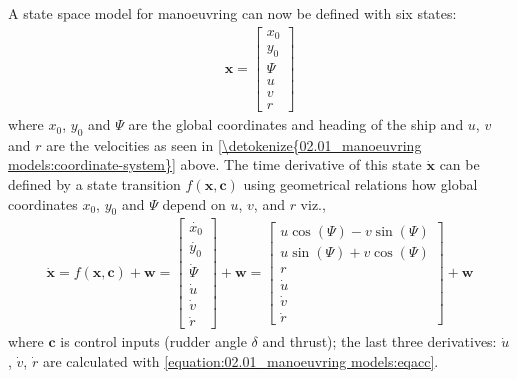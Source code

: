 \noindent A state space model for manoeuvring can now be defined with six states:
\begin{equation}\label{equation:02.01_manoeuvring models:eq_x}
\begin{split}\displaystyle \mathbf{x} = \left[\begin{matrix}x_{0}\\y_{0}\\\Psi\\u\\v\\r\end{matrix}\right]\end{split}
\end{equation}
\noindent where $x_0$, $y_0$ and $\Psi$ are the global coordinates and heading of the ship and $u$, $v$ and $r$ are the velocities as seen in \autoref{\detokenize{02.01_manoeuvring models:coordinate-system}} above.
The time derivative of this state \(\dot{\mathbf{x}}\) can be defined by a state transition \(f(\mathbf{x},\mathbf{c})\) using geometrical relations
how global coordinates \(x_0\), \(y_0\) and \(\Psi\) depend on \(u\), \(v\), and \(r\) viz.,
\begin{equation}\label{equation:02.01_manoeuvring models:eqf}
\begin{split}\displaystyle \dot{\mathbf{x}} = f(\mathbf{x},\mathbf{c}) + \mathbf{w}
                                          = \left[\begin{matrix}\dot{x_0}\\ \dot{y_0} \\ \dot{\Psi} \\\dot{u}\\\dot{v}\\\dot{r}\end{matrix}\right] + \mathbf{w}
                                          = \left[\begin{matrix}u \cos{\left(\Psi \right)} - v \sin{\left(\Psi \right)}\\u \sin{\left(\Psi \right)} + v \cos{\left(\Psi \right)}\\r\\\dot{u}\\\dot{v}\\\dot{r}\end{matrix}\right] + \mathbf{w}\end{split}
\end{equation}
\sphinxAtStartPar
where \(\mathbf{c}\) is control inputs (rudder angle \(\delta\) and thrust); the last three derivatives: \(\dot{u}\), \(\dot{v}\), \(\dot{r}\) are calculated with \autoref{equation:02.01_manoeuvring models:eqacc}.
